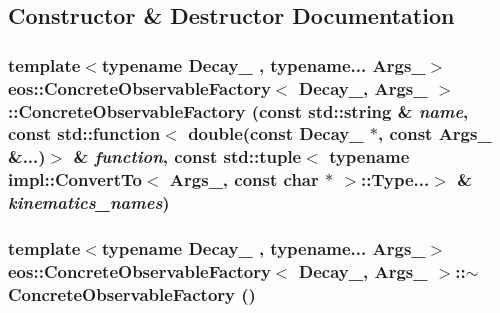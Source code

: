 \subsection{Constructor \& Destructor Documentation}
\hypertarget{classeos_1_1ConcreteObservableFactory_a56251553542fa722a00778c2f2040f1e}{
\subsubsection[{ConcreteObservableFactory}]{\setlength{\rightskip}{0pt plus 5cm}template$<$typename Decay\_\- , typename... Args\_\-$>$ {\bf eos::ConcreteObservableFactory}$<$ Decay\_\-, Args\_\- $>$::{\bf ConcreteObservableFactory} (const std::string \& {\em name}, \/  const std::function$<$ double(const Decay\_\- $\ast$, const Args\_\- \&...)$>$ \& {\em function}, \/  const std::tuple$<$ typename impl::ConvertTo$<$ Args\_\-, const char $\ast$ $>$::Type...$>$ \& {\em kinematics\_\-names})}}
\label{classeos_1_1ConcreteObservableFactory_a56251553542fa722a00778c2f2040f1e}
\hypertarget{classeos_1_1ConcreteObservableFactory_a51f8f732c836a6ae924655c988c51490}{
\subsubsection[{$\sim$ConcreteObservableFactory}]{\setlength{\rightskip}{0pt plus 5cm}template$<$typename Decay\_\- , typename... Args\_\-$>$ {\bf eos::ConcreteObservableFactory}$<$ Decay\_\-, Args\_\- $>$::$\sim${\bf ConcreteObservableFactory} ()}}
\label{classeos_1_1ConcreteObservableFactory_a51f8f732c836a6ae924655c988c51490}


